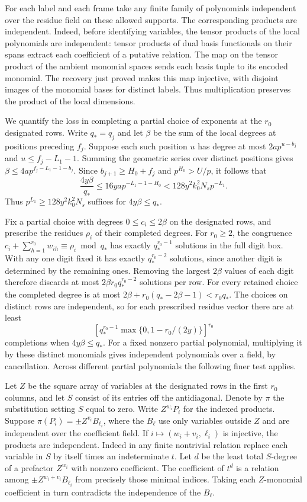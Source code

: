 \documentclass[11pt]{amsart}
\theoremstyle{definition}
\theoremstyle{remark}
\begin{document}
For each label and each frame take any finite family of polynomials
independent over the residue field on these allowed supports.
The corresponding products are independent. Indeed, before
identifying variables, the tensor products of the local polynomials
are independent: tensor products of dual basis functionals on their
spans extract each coefficient of a putative relation. The map on
the tensor product of the ambient monomial spaces sends each basis
tuple to its encoded monomial. The recovery just proved makes this
map injective, with disjoint images of the monomial bases for
distinct labels. Thus multiplication preserves the product of the
local dimensions.

We quantify the loss in completing a partial choice of exponents
at the $r_0$ designated rows. Write $q_*=q_j$ and let $\beta$ be
the sum of the local degrees at positions preceding $f_j$.
Suppose each such position $u$ has degree at most $2a p^{u-b_j}$
and $u\le f_j-L_1-1$. Summing the geometric series over distinct
positions gives $\beta\le4a p^{f_j-L_1-1-b_j}$. Since
$b_{j+1}\ge H_0+f_j$ and $p^{H_0}>U/p$, it follows that
\[
 \frac{4y\beta}{q_*}\le16ya p^{-L_1-1-H_0}
 <128 y^2 k_0^2 N_s p^{-L_1}.
\]
Thus $p^{L_1}\ge128 y^2 k_0^2N_s$ suffices for $4y\beta\le q_*$.

Fix a partial choice with degrees $0\le c_i\le2\beta$ on the
designated rows, and prescribe the residues $\rho_i$ of their
completed degrees. For $r_0\ge2$, the congruence
$c_i+\sum_{h=1}^{r_0}w_{ih}\equiv\rho_i\bmod q_*$
has exactly $q_*^{r_0-1}$ solutions in the full digit box.
With any one digit fixed it has exactly $q_*^{r_0-2}$ solutions,
since another digit is determined by the remaining ones.
Removing the largest $2\beta$ values of each digit therefore
discards at most $2\beta r_0 q_*^{r_0-2}$ solutions per row.
For every retained choice the completed degree is at most
$2\beta+r_0(q_*-2\beta-1)<r_0q_*$. The choices on distinct
rows are independent, so for each prescribed residue vector there
are at least
\[
 \left[q_*^{r_0-1}\max\{0,1-r_0/(2y)\}\right]^{r_0}
\]
completions when $4y\beta\le q_*$. For a fixed nonzero partial
polynomial, multiplying it by these distinct monomials gives
independent polynomials over a field, by cancellation. Across
different partial polynomials the following finer test applies.

Let $Z$ be the square array of variables at the designated rows
in the first $r_0$ columns, and let $S$ consist of its entries off
the antidiagonal. Denote by $\pi$ the substitution setting $S$
equal to zero. Write $Z^{w_i}P_i$ for the indexed products.
Suppose $\pi(P_i)=\pm Z^{v_i}B_{\ell_i}$, where the $B_\ell$ use
only variables outside $Z$ and are independent over the coefficient
field. If $i\mapsto(w_i+v_i,\ell_i)$ is injective, the products
are independent. Indeed in any finite nontrivial relation replace
each variable in $S$ by itself times an indeterminate $t$. Let $d$
be the least total $S$-degree of a prefactor $Z^{w_i}$ with nonzero
coefficient. The coefficient of $t^d$ is a relation among
$\pm Z^{w_i+v_i}B_{\ell_i}$ from precisely those minimal indices.
Taking each $Z$-monomial coefficient in turn contradicts the
independence of the $B_\ell$.
\end{document}
